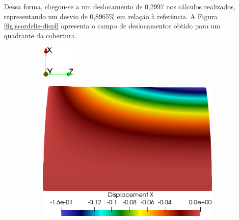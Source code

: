 Dessa forma, chegou-se a um deslocamento de 0,2997 nos cálculos realizados, representando um desvio de 0,8965\% em relação à referência. A Figura \ref{fig:scordelis-displ} apresenta o campo de deslocamentos obtido para um quadrante da cobertura.

\begin{figure}[h!]
    \centering
    \caption{Campos de deslocamentos obtido na simulação de \textit{Scordelis-Lo roof}.}
    \begin{subfigure}{0.05\textwidth}
        \includegraphics[width=\linewidth]{Figuras/scordelis/eixos.png}
    \end{subfigure}
    \begin{subfigure}{0.31\textwidth}
        \includegraphics[width=\linewidth]{Figuras/scordelis/ux.png}

\end{subfigure}
\end{figure}
